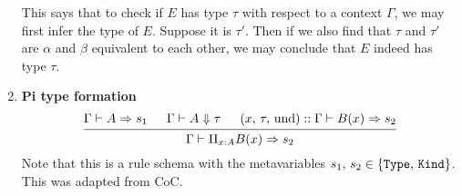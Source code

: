 \documentclass{article}
\begin{document}
\begin{enumerate}
  This says that to check if $E$ has type $\tau$ with respect to a context
  $\Gamma$, we may first infer the type of $E$. Suppose it is $\tau'$. Then
  if we also find that $\tau$ and $\tau'$ are $\alpha$ and $\beta$ equivalent
  to each other, we may conclude that $E$ indeed has type $\tau$.






\item \textbf{Pi type formation} \\
  \[
    \begin{prooftree}
      \hypo{\Gamma \vdash A \Rightarrow s_1}
      \hypo{\Gamma \vdash A \Downarrow \tau}
      \hypo{(x, \, \tau, \, \text{und}) :: \Gamma \vdash B(x) \Rightarrow s_2}
      \infer3{\Gamma \vdash \Pi_{x : A}B(x) \Rightarrow s_2}
    \end{prooftree}
  \]
  Note that this is a rule schema with the metavariables 
  $s_1, \, s_2 \in \{\texttt{Type}, \, \texttt{Kind}\}$.
  This was adapted from CoC.



\end{enumerate}
\end{document}
